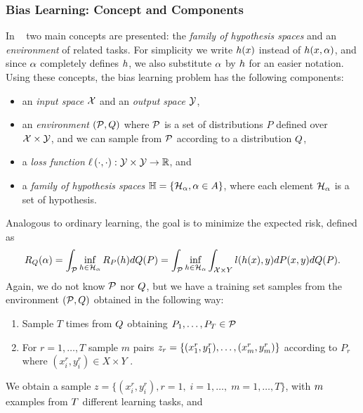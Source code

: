 \subsubsection*{Bias Learning: Concept and Components}
In ~\cite{baxter2000model} two main concepts are presented: the \emph{family of hypothesis spaces} and an \emph{environment} of related tasks. 
For simplicity we write $h(x)$  instead of $h(x, \alpha)$, and since $\alpha$ completely defines $h$, we also substitute $\alpha$ by $h$ for an easier notation.
Using these concepts, the bias learning problem has the following components:
\begin{itemize}
    \item an \emph{input space} $\mathcal{X}$ and an \emph{output space} $\mathcal{Y}$,
    \item an \emph{environment} $(\mathcal{P}, Q)$ where $\mathcal{P}$ is a set of distributions $P$ defined over $\mathcal{X} \times \mathcal{Y}$, and we can sample from $\mathcal{P}$ according to a distribution $Q$,
    \item a \emph{loss function} $\ell\left( \cdot, \cdot\right):\mathcal{Y} \times \mathcal{Y} \to \mathbb{R}$, and
    \item a \emph{family of hypothesis spaces} $\mathbb{H} = \left\{\mathcal{H}_\alpha, \alpha \in A\right\}$, where each element $\mathcal{H}_\alpha$ is a set of hypothesis.
\end{itemize}
Analogous to ordinary learning, the goal is to minimize the expected risk, defined as
\begin{equation}\label{eq:biaslearn_exprisk}
    \bexprisk(\param) = \int_{\bprobspace} \inf_{\hypf \in \hypspace_\param} \risk_P(\hypf) d\bdistf(P) = \int_{\bprobspace} \inf_{\hypf \in \hypspace_\param} \int_{\Xspace \times Y} l(h(x), y) dP(x, y) d\bdistf(P).
\end{equation}
Again, we do not know $\mathcal{P}$ nor $Q$, but we have a training set samples from the environment $(\mathcal{P}, Q)$ obtained in the following way:
\begin{enumerate}
    \item Sample $T$ times from $Q$ obtaining $P_1, \ldots, P_T \in \mathcal{P}$
    \item For $r=1, \ldots, T$ sample $m$ pairs $z_r = \{(x_1^r, y_1^r), \ldots, (x_m^r, y_m^r)\}$ according to $P_r$ where $(x_i^r, y_i^r) \in X \times Y$ .
\end{enumerate}
We obtain a sample $z=\{(x_i^r, y_i^r), r=1,\; i=1, \ldots, \;m=1, \ldots, T\}$, with $m$ examples from $T$ different learning tasks, and
